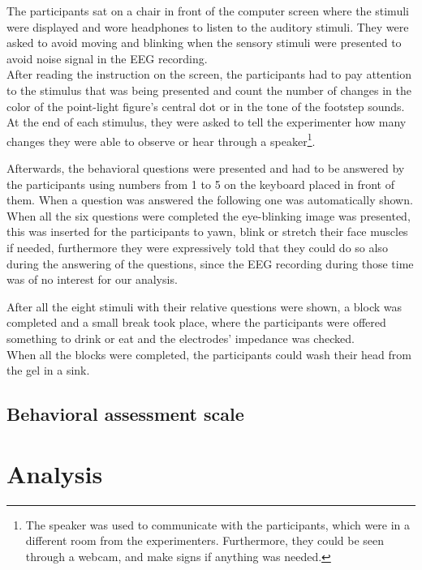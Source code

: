 The participants sat on a chair in front of the computer screen where the stimuli were displayed and wore headphones to listen to the auditory stimuli. They were asked to avoid moving and blinking when the sensory stimuli were presented to avoid noise signal in the EEG recording. \\
After reading the instruction on the screen, the participants had to pay attention to the stimulus that was being presented and count the number of changes in the color of the point-light figure's central dot or in the tone of the footstep sounds. At the end of each stimulus, they were asked to tell the experimenter how many changes they were able to observe or hear through a speaker\footnote{The speaker was used to communicate with the participants, which were in a different room from the experimenters. Furthermore, they could be seen through a webcam, and make signs if anything was needed.}. 

Afterwards, the behavioral questions were presented and had to be answered by the participants using numbers from 1 to 5 on the keyboard placed in front of them. When a question was answered the following one was automatically shown. When all the six questions were completed the eye-blinking image was presented, this was inserted for the participants to yawn, blink or stretch their face muscles if needed, furthermore they were expressively told that they could do so also during the answering of the questions, since the EEG recording during those time was of no interest for our analysis.  

After all the eight stimuli with their relative questions were shown, a block was completed and a small break took place, where the participants were offered something to drink or eat and the electrodes' impedance was checked. \\
When all the blocks were completed, the participants could wash their head from the gel in a sink.

\subsection*{Behavioral assessment scale}

\section{Analysis}
